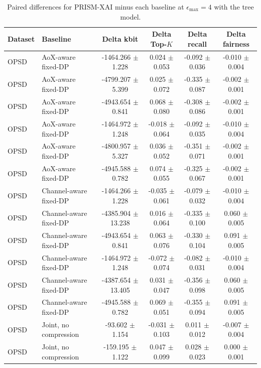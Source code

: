 \begin{table}[t]
\caption{Paired differences for PRISM-XAI minus each baseline at $\epsilon_{\max}=4$ with the tree model.}
\label{tab:paired-differences}
\centering
\scriptsize
\setlength{\tabcolsep}{3pt}
\begin{tabular}{llcccc}
\toprule
Dataset & Baseline & Delta kbit & Delta Top-$K$ & Delta recall & Delta fairness \\
\midrule
OPSD & AoX-aware fixed-DP & -1464.266 $\pm$ 1.228 & 0.024 $\pm$ 0.053 & -0.092 $\pm$ 0.036 & -0.010 $\pm$ 0.004 \\
OPSD & AoX-aware fixed-DP & -4799.207 $\pm$ 5.399 & 0.025 $\pm$ 0.072 & -0.335 $\pm$ 0.087 & -0.002 $\pm$ 0.001 \\
OPSD & AoX-aware fixed-DP & -4943.654 $\pm$ 0.841 & 0.068 $\pm$ 0.080 & -0.308 $\pm$ 0.086 & -0.002 $\pm$ 0.001 \\
OPSD & AoX-aware fixed-DP & -1464.972 $\pm$ 1.248 & -0.018 $\pm$ 0.064 & -0.092 $\pm$ 0.035 & -0.010 $\pm$ 0.004 \\
OPSD & AoX-aware fixed-DP & -4800.957 $\pm$ 5.327 & 0.036 $\pm$ 0.052 & -0.351 $\pm$ 0.071 & -0.002 $\pm$ 0.001 \\
OPSD & AoX-aware fixed-DP & -4945.588 $\pm$ 0.782 & 0.074 $\pm$ 0.055 & -0.325 $\pm$ 0.067 & -0.002 $\pm$ 0.001 \\
OPSD & Channel-aware fixed-DP & -1464.266 $\pm$ 1.228 & -0.035 $\pm$ 0.061 & -0.079 $\pm$ 0.032 & -0.010 $\pm$ 0.004 \\
OPSD & Channel-aware fixed-DP & -4385.904 $\pm$ 13.238 & 0.016 $\pm$ 0.064 & -0.335 $\pm$ 0.100 & 0.060 $\pm$ 0.005 \\
OPSD & Channel-aware fixed-DP & -4943.654 $\pm$ 0.841 & 0.063 $\pm$ 0.076 & -0.330 $\pm$ 0.104 & 0.091 $\pm$ 0.005 \\
OPSD & Channel-aware fixed-DP & -1464.972 $\pm$ 1.248 & -0.072 $\pm$ 0.074 & -0.082 $\pm$ 0.031 & -0.010 $\pm$ 0.004 \\
OPSD & Channel-aware fixed-DP & -4387.654 $\pm$ 13.405 & 0.031 $\pm$ 0.047 & -0.356 $\pm$ 0.098 & 0.060 $\pm$ 0.005 \\
OPSD & Channel-aware fixed-DP & -4945.588 $\pm$ 0.782 & 0.069 $\pm$ 0.051 & -0.355 $\pm$ 0.094 & 0.091 $\pm$ 0.005 \\
OPSD & Joint, no compression & -93.602 $\pm$ 1.154 & -0.031 $\pm$ 0.103 & 0.011 $\pm$ 0.012 & -0.007 $\pm$ 0.004 \\
OPSD & Joint, no compression & -159.195 $\pm$ 1.122 & 0.047 $\pm$ 0.099 & 0.028 $\pm$ 0.023 & 0.000 $\pm$ 0.001 \\

\end{tabular}
\end{table}
